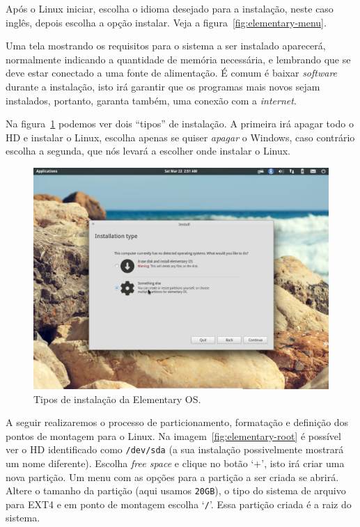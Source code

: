 \documentclass{handout_utfpr}
\begin{document}
Após o Linux iniciar, escolha o idioma desejado para a instalação, neste caso inglês, depois escolha a opção instalar. Veja a figura~\ref{fig:elementary-menu}.

Uma tela mostrando os requisitos para o sistema a ser instalado aparecerá, normalmente indicando a quantidade de memória necessária, e lembrando que se deve estar conectado a uma fonte de alimentação.
É comum é baixar \textit{software} durante a instalação, isto irá garantir que os programas mais novos sejam instalados, portanto, garanta também, uma conexão com a \textit{internet}.

Na figura~\ref{fig:elementary-install} podemos ver dois ``tipos'' de instalação. A primeira irá apagar todo o HD e instalar o Linux, escolha apenas se quiser \emph{apagar} o Windows, caso contrário escolha a segunda, que nós levará a escolher onde instalar o Linux.

\begin{figure}[h]
  \centering
  \includegraphics[scale=.6]{imagens/elementary-install-03.png}
  \caption{Tipos de instalação da Elementary OS\@.}
  \label{fig:elementary-install}
\end{figure}

A seguir realizaremos o processo de particionamento, formatação e definição dos pontos de montagem para o Linux. Na imagem~\ref{fig:elementary-root} é possível ver o HD identificado como \texttt{/dev/sda} (a sua instalação possivelmente mostrará um nome diferente). Escolha \textit{free space} e clique no botão `+', isto irá criar uma nova partição. Um menu com as opções para a partição a ser criada se abrirá. Altere o tamanho da partição (aqui usamos \texttt{20GB}), o tipo do sistema de arquivo para EXT4 e em ponto de montagem escolha `\texttt{/}'. Essa partição criada é a raiz do sistema.
\end{document}
